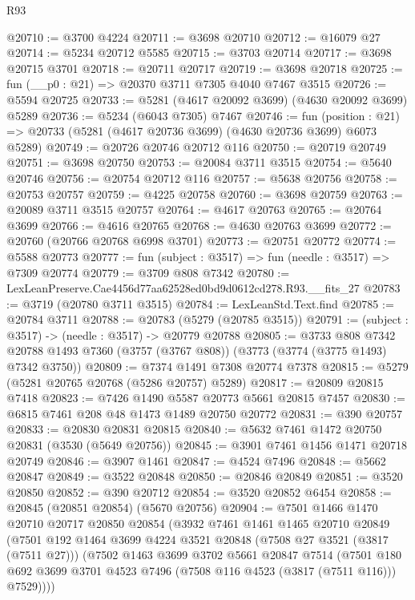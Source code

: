 \begin{lexlean}{R93}
\begin{coremodule}
@20710 := @3700 @4224
@20711 := @3698 @20710
@20712 := @16079 @27
@20714 := @5234 @20712 @5585
@20715 := @3703 @20714
@20717 := @3698 @20715 @3701
@20718 := @20711 @20717
@20719 := @3698 @20718
@20725 := fun (__p0 : @21) => @20370 @3711 @7305 @4040 @7467 @3515
@20726 := @5594 @20725
@20733 := @5281 (@4617 @20092 @3699) (@4630 @20092 @3699) @5289
@20736 := @5234 (@6043 @7305) @7467
@20746 := fun (position : @21) =>
  @20733 (@5281 (@4617 @20736 @3699) (@4630 @20736 @3699) @6073 @5289)
@20749 := @20726 @20746 @20712 @116
@20750 := @20719 @20749
@20751 := @3698 @20750
@20753 := @20084 @3711 @3515
@20754 := @5640 @20746
@20756 := @20754 @20712 @116
@20757 := @5638 @20756
@20758 := @20753 @20757
@20759 := @4225 @20758
@20760 := @3698 @20759
@20763 := @20089 @3711 @3515 @20757
@20764 := @4617 @20763
@20765 := @20764 @3699
@20766 := @4616 @20765
@20768 := @4630 @20763 @3699
@20772 := @20760 (@20766 @20768 @6998 @3701)
@20773 := @20751 @20772
@20774 := @5588 @20773
@20777 := fun (subject : @3517) => fun (needle : @3517) => @7309 @20774
@20779 := @3709 @808 @7342
@20780 := LexLeanPreserve.Cae4456d77aa62528ed0bd9d0612cd278.R93.__fits_27
@20783 := @3719 (@20780 @3711 @3515)
@20784 := LexLeanStd.Text.find
@20785 := @20784 @3711
@20788 := @20783 (@5279 (@20785 @3515))
@20791 := (subject : @3517) -> (needle : @3517) -> @20779 @20788
@20805 := @3733
    @808
    @7342
    @20788
    @1493
    @7360
    (@3757 (@3767 @808))
    (@3773 (@3774 (@3775 @1493) @7342 @3750))
@20809 := @7374 @1491 @7308 @20774 @7378
@20815 := @5279 (@5281 @20765 @20768 (@5286 @20757) @5289)
@20817 := @20809 @20815 @7418
@20823 := @7426 @1490 @5587 @20773 @5661 @20815 @7457
@20830 := @6815 @7461 @208 @48 @1473 @1489 @20750 @20772
@20831 := @390 @20757
@20833 := @20830 @20831 @20815
@20840 := @5632 @7461 @1472 @20750 @20831 (@3530 (@5649 @20756))
@20845 := @3901 @7461 @1456 @1471 @20718 @20749
@20846 := @3907 @1461
@20847 := @4524 @7496
@20848 := @5662 @20847
@20849 := @3522 @20848
@20850 := @20846 @20849
@20851 := @3520 @20850
@20852 := @390 @20712
@20854 := @3520 @20852 @6454
@20858 := @20845 (@20851 @20854) (@5670 @20756)
@20904 := @7501
    @1466
    @1470
    @20710
    @20717
    @20850
    @20854
    (@3932
      @7461
      @1461
      @1465
      @20710
      @20849
      (@7501
        @192
        @1464
        @3699
        @4224
        @3521
        @20848
        (@7508 @27 @3521 (@3817 (@7511 @27)))
        (@7502
          @1463
          @3699
          @3702
          @5661
          @20847
          @7514
          (@7501 @180 @692 @3699 @3701 @4523 @7496 (@7508 @116 @4523 (@3817 (@7511 @116))) @7529))))

\end{coremodule}
\end{lexlean}
